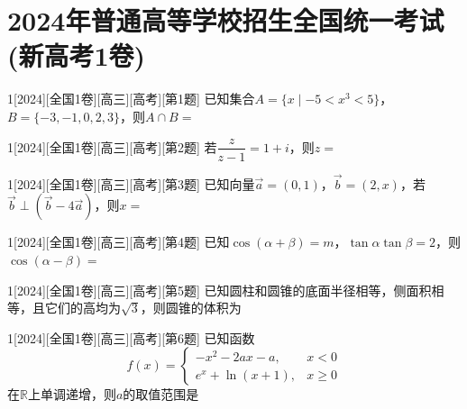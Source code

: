 \section{2024年普通高等学校招生全国统一考试(新高考1卷)}
\begin{example}{1}[2024][全国1卷][高三][高考][第1题]
已知集合$A=\{x\mid -5<x^3<5\}$，$B=\{-3,-1,0,2,3\}$，则$A\cap B=$\blankbox
\begin{choices}
\end{choices}
\end{example}

\begin{example}{1}[2024][全国1卷][高三][高考][第2题]
若$\dfrac{z}{z-1}=1+i$，则$z=$\blankbox
\begin{choices}
\end{choices}
\end{example}

\begin{example}{1}[2024][全国1卷][高三][高考][第3题]
已知向量$\vec{a}=(0,1)$，$\vec{b}=(2,x)$，若$\vec{b}\perp(\vec{b}-4\vec{a})$，则$x=$\blankbox
\begin{choices}
\end{choices}
\end{example}

\begin{example}{1}[2024][全国1卷][高三][高考][第4题]
已知$\cos(\alpha+\beta)=m$，$\tan\alpha\tan\beta=2$，则$\cos(\alpha-\beta)=$\blankbox
\begin{choices}
\end{choices}
\end{example}

\begin{example}{1}[2024][全国1卷][高三][高考][第5题]
已知圆柱和圆锥的底面半径相等，侧面积相等，且它们的高均为$\sqrt{3}$，则圆锥的体积为\blankbox
\begin{choices}
\end{choices}
\end{example}

\begin{example}{1}[2024][全国1卷][高三][高考][第6题]
已知函数
\[
f(x)=
\begin{cases}
-x^2-2ax-a, & x<0\\
e^x+\ln(x+1), & x\ge 0
\end{cases}
\]
在$\mathbb{R}$上单调递增，则$a$的取值范围是\blankbox
\begin{choices}
\choice{$(-\infty,0]$}
\choice{$[-1,0]$}
\choice{$[-1,1]$}
\choice{$[0,+\infty)$}
\end{choices}
\end{example}


